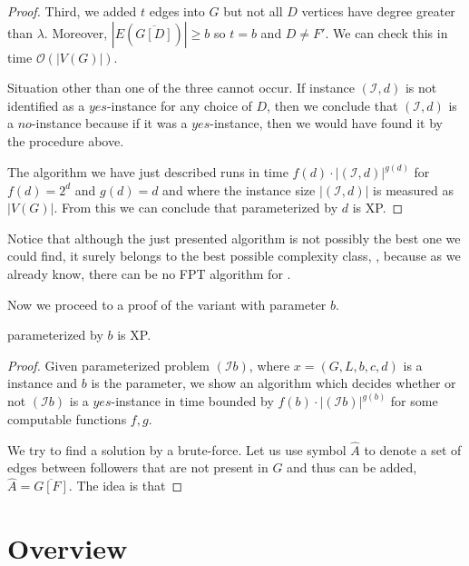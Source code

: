 \begin{proof}
    Third, we added $t$ edges into $G$ but not all $D$ vertices have degree greater than $\lambda$.
    Moreover, $|E(\overline{G[D]})| \geq b$ so $t = b$ and $D \neq F'$.
    We can check this in time $\mathcal{O}(|V(G)|)$.

    Situation other than one of the three cannot occur.
    If instance $(\mathcal{I}, d)$ is not identified as a $yes$-instance for any choice of $D$,
    then we conclude that $(\mathcal{I}, d)$ is a $no$-instance because if it was a $yes$-instance,
    then we would have found it by the procedure above.
    
    The algorithm we have just described runs in time $f(d) \cdot |(\mathcal{I}, d)|^{g(d)}$ for $f(d) = 2^d$ and $g(d) = d$
    and where the instance size $|(\mathcal{I}, d)|$ is measured as $|V(G)|$.
    From this we can conclude that \HL parameterized by $d$ is XP.
\end{proof}

Notice that although the just presented algorithm is not possibly the best one we could find,
it surely belongs to the best possible complexity class, \XP, because as we already know,
there can be no FPT algorithm for \HL. 


Now we proceed to a proof of the variant with parameter $b$.

\begin{theorem}
    \HL parameterized by $b$ is XP.
\end{theorem}

\begin{proof}
    Given parameterized problem $(\mathcal{I} b)$, where $x = (G, L, b, c, d)$ is a \HLdeg instance and $b$ is the parameter,
    we show an algorithm which decides whether or not $(\mathcal{I} b)$ is a $yes$-instance in time bounded by
    $f(b) \cdot |(\mathcal{I} b)|^{g(b)}$ for some computable functions $f,g$.

    We try to find a solution by a brute-force.
    Let us use symbol $\hat{A}$ to denote a set of edges between followers that are not present in $G$ and
    thus can be added, $\hat{A} = \overline{G[F]}$.
    The idea is that 
\end{proof}


\section{Overview}

\label{lem:allHDG:FPT:ColorsSize}
\label{lem:allHDGNash:XP:ColorsStrongNum}
\label{lem:allHDG:XP:ColorsTypes}
\label{lem:allHDGNash:XP:ColorsWeakNum}
\label{lem:allHDG:NPh:TypesNum}
\label{lem:allHDG:NPh:SizeTypes}
\label{lem:allHDG:FPT:StrongNumSize}
\label{lem:allHDG:XP:WeakNumSize}
\label{lem:allHDG:Wh:ColorsNumTypes}
\label{lem:allHDG:Wh:SizeTypeNum}

